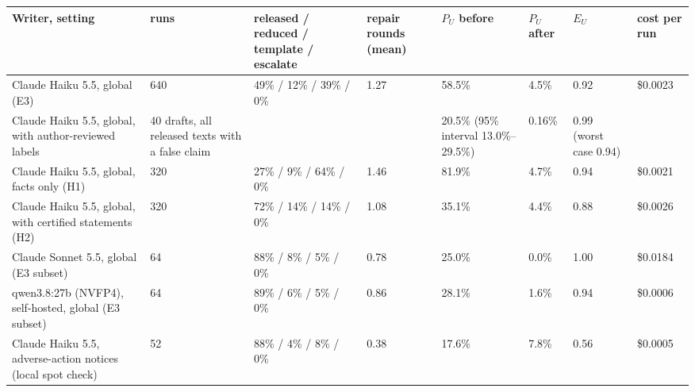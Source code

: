 \begin{tabular}{p{3.7cm}p{1.7cm}p{2.1cm}p{1.1cm}p{1.9cm}p{1.1cm}p{1.6cm}p{1.1cm}}
\toprule
\textbf{Writer, setting} & \textbf{runs} & \textbf{released / reduced / template / escalate} & \textbf{repair rounds (mean)} & \textbf{$P_U$ before} & \textbf{$P_U$ after} & \textbf{$E_U$} & \textbf{cost per run} \\
\midrule
Claude Haiku 5.5, global (E3) & 640 & 49\% / 12\% / 39\% / 0\% & 1.27 & 58.5\% & 4.5\% & 0.92 & \$0.0023 \\
Claude Haiku 5.5, global, with author-reviewed labels & 40 drafts, all released texts with a false claim &  &  & 20.5\% (95\% interval 13.0\%–29.5\%) & 0.16\% & 0.99 (worst case 0.94) &  \\
Claude Haiku 5.5, global, facts only (H1) & 320 & 27\% / 9\% / 64\% / 0\% & 1.46 & 81.9\% & 4.7\% & 0.94 & \$0.0021 \\
Claude Haiku 5.5, global, with certified statements (H2) & 320 & 72\% / 14\% / 14\% / 0\% & 1.08 & 35.1\% & 4.4\% & 0.88 & \$0.0026 \\
Claude Sonnet 5.5, global (E3 subset) & 64 & 88\% / 8\% / 5\% / 0\% & 0.78 & 25.0\% & 0.0\% & 1.00 & \$0.0184 \\
qwen3.8:27b (NVFP4), self-hosted, global (E3 subset) & 64 & 89\% / 6\% / 5\% / 0\% & 0.86 & 28.1\% & 1.6\% & 0.94 & \$0.0006 \\
Claude Haiku 5.5, adverse-action notices (local spot check) & 52 & 88\% / 4\% / 8\% / 0\% & 0.38 & 17.6\% & 7.8\% & 0.56 & \$0.0005 \\
\bottomrule
\end{tabular}
